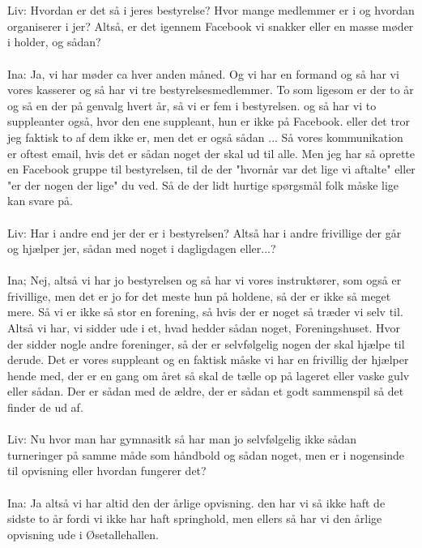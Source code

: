 \\\\
Liv: Hvordan er det så i jeres bestyrelse? Hvor mange medlemmer er i og hvordan organiserer i jer? Altså, er det igennem Facebook vi snakker eller en masse møder i holder, og sådan?
\\\\
Ina: Ja, vi har møder ca hver anden måned. Og vi har en formand og så har vi vores kasserer og så har vi tre bestyrelsesmedlemmer. To som ligesom er der to år og så en der på genvalg hvert år, så vi er fem i bestyrelsen. og så har vi to suppleanter også,  hvor den ene suppleant, hun er ikke på Facebook. eller det tror jeg faktisk to af dem ikke er, men det er også sådan ... Så vores kommunikation er oftest email, hvis det er sådan noget der skal ud til alle. Men jeg har så oprette en Facebook gruppe til bestyrelsen, til de der "hvornår var det lige vi aftalte" eller "er der nogen der lige" du ved. Så de der lidt hurtige spørgsmål folk måske lige kan svare på.
\\\\
Liv: Har i andre end jer der er i bestyrelsen? Altså har i andre frivillige der går og hjælper jer, sådan med noget i dagligdagen eller...?
\\\\
Ina; Nej, altså vi har jo bestyrelsen  og så  har vi vores instruktører, som også er frivillige, men det er jo for det meste hun på holdene, så  der er ikke så meget mere. Så  vi er ikke så stor en forening, så hvis der er noget så træder vi selv til. Altså  vi har, vi sidder ude i et, hvad hedder sådan noget, Foreningshuset. Hvor der sidder nogle andre foreninger, så der er selvfølgelig nogen der skal hjælpe til derude. Det er vores suppleant og en faktisk måske vi har en frivillig der hjælper hende med, der er en gang om året så skal de tælle op på lageret eller vaske gulv eller sådan. Der er sådan  med de ældre, der er sådan et godt sammenspil så det finder de ud af. 
\\\\
Liv: Nu hvor man har gymnasitk så har man jo selvfølgelig ikke sådan turneringer på samme måde som håndbold og sådan noget, men er i nogensinde til opvisning eller hvordan fungerer det?
\\\\
Ina: Ja altså vi har altid den der årlige opvisning. den har vi så ikke haft de sidste to år fordi vi ikke har haft springhold, men ellers så har vi den årlige opvisning ude i Øsetallehallen. 
\\\\
